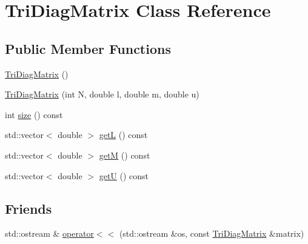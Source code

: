 \hypertarget{classTriDiagMatrix}{\section{Tri\-Diag\-Matrix Class Reference}
\label{classTriDiagMatrix}
}
\subsection*{Public Member Functions}
\begin{DoxyCompactItemize}
\item 
\hyperlink{classTriDiagMatrix_a089010de74d434cd0c9ca33f9421b898}{Tri\-Diag\-Matrix} ()
\item 
\hyperlink{classTriDiagMatrix_a566110e41f5c7d507ad1bff5e4d3b741}{Tri\-Diag\-Matrix} (int N, double l, double m, double u)
\item 
int \hyperlink{classTriDiagMatrix_aa53da203fa736ccceed43a0951b19f9b}{size} () const 
\item 
std\-::vector$<$ double $>$ \hyperlink{group__getdiagonals_ga1fc79c48a0e508670d9cb446bdb89ac0}{get\-L} () const 
\item 
std\-::vector$<$ double $>$ \hyperlink{group__getdiagonals_gaef21cbb3555650842cc666112732110e}{get\-M} () const 
\item 
std\-::vector$<$ double $>$ \hyperlink{group__getdiagonals_ga23e779914d8691b0b9012c4f45e036ca}{get\-U} () const 
\end{DoxyCompactItemize}
\subsection*{Friends}
\begin{DoxyCompactItemize}
\item 
std\-::ostream \& \hyperlink{classTriDiagMatrix_aa1a851ed9f0913d84926e28860597ac3}{operator$<$$<$} (std\-::ostream \&os, const \hyperlink{classTriDiagMatrix}{Tri\-Diag\-Matrix} \&matrix)
\end{DoxyCompactItemize}


